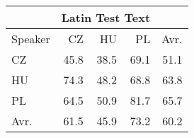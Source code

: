 \begin{tabular}{l|rrr|r}
\hline
 & \multicolumn{3}{c}{Latin Test Text} & \\
\hline
 Speaker   &   CZ &   HU &   PL &   Avr. \\
\hline
 CZ        & 45.8 & 38.5 & 69.1 &   51.1 \\
 HU        & 74.3 & 48.2 & 68.8 &   63.8 \\
 PL        & 64.5 & 50.9 & 81.7 &   65.7 \\
\hline
 Avr.     & 61.5 & 45.9 & 73.2 &   60.2 \\
\hline
\end{tabular}